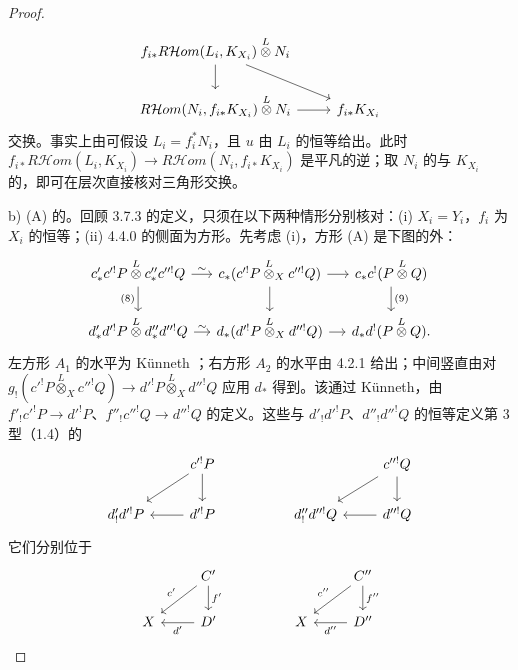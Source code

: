 \begin{proof}
\[\begin{tikzcd}
f_{i*}R\mathcal Hom(L_i,K_{X_i})\mathbin{\overset L\otimes}N_i\arrow[d]\arrow[dr]\\ R\mathcal Hom(N_i,f_{i*}K_{X_i})\mathbin{\overset L\otimes}N_i\arrow[r]&f_{i*}K_{X_i}
\end{tikzcd}\]
交换。事实上由可假设 $L_i=f_i^*N_i$，且 $u$ 由 $L_i$ 的恒等给出。此时 $f_{i*}R\mathcal Hom(L_i,K_{X_i})\to R\mathcal Hom(N_i,f_{i*}K_{X_i})$ 是平凡的逆；取 $N_i$ 的与 $K_{X_i}$ 的，即可在层次直接核对三角形交换。

 b) (A) 的。回顾 3.7.3 的定义，只须在以下两种情形分别核对：(i) $X_i=Y_i$，$f_i$ 为 $X_i$ 的恒等；(ii) 4.4.0 的侧面为方形。先考虑 (i)，方形 (A) 是下图的外：
\[\begin{tikzcd}[column sep=small]
c'_*c'^!P\mathbin{\overset L\otimes}c''_*c''^!Q\arrow[r,"\sim"]\arrow[d,"(8)"']&c_*(c'^!P\mathbin{\overset L\otimes}_Xc''^!Q)\arrow[r]\arrow[d]&c_*c^!(P\mathbin{\overset L\otimes}Q)\arrow[d,"(9)"]\\ d'_*d'^!P\mathbin{\overset L\otimes}d''_*d''^!Q\arrow[r,"\sim"]&d_*(d'^!P\mathbin{\overset L\otimes}_Xd''^!Q)\arrow[r]&d_*d^!(P\mathbin{\overset L\otimes}Q).
\end{tikzcd}\]
左方形 $A_1$ 的水平为 Künneth ；右方形 $A_2$ 的水平由 4.2.1 给出；中间竖直由对 $g_!(c'^!P\mathbin{\overset L\otimes}_Xc''^!Q)\to d'^!P\mathbin{\overset L\otimes}_Xd''^!Q$ 应用 $d_*$ 得到。该通过 Künneth，由 $f'_!c'^!P\to d'^!P$、$f''_!c''^!Q\to d''^!Q$ 的定义。这些与 $d'_!d'^!P$、$d''_!d''^!Q$ 的恒等定义第 3 型（1.4）的
\[\begin{tikzcd}&c'^!P\arrow[dl]\arrow[d]&&&c''^!Q\arrow[dl]\arrow[d]\\d'_!d'^!P&d'^!P\arrow[l]&&d''_!d''^!Q&d''^!Q\arrow[l]\end{tikzcd}\]
它们分别位于
\[\begin{tikzcd}&C'\arrow[dl,"c'"']\arrow[d,"f'"]&&&C''\arrow[dl,"c''"']\arrow[d,"f''"]\\X&D'\arrow[l,"d'"]&&X&D''\arrow[l,"d''"]\end{tikzcd}\]

\end{proof}
